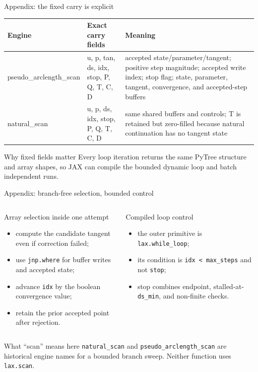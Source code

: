 \begin{frame}{Appendix: the fixed carry is explicit}
\scriptsize
\begin{center}
\begin{tabular}{>{\ttfamily}p{}p{}p{}}
\toprule
Engine & Exact carry fields & Meaning\\
\midrule
pseudo\_arclength\_scan &
u, p, tan, ds, idx, stop, P, Q, T, C, D &
accepted state/parameter/tangent; positive step magnitude; accepted write
index; stop flag; state, parameter, tangent, convergence, and accepted-step buffers\\
\addlinespace
natural\_scan &
u, p, ds, idx, stop, P, Q, T, C, D &
same shared buffers and controls; T is retained but zero-filled because natural continuation has no tangent state\\
\bottomrule
\end{tabular}
\end{center}

\begin{block}{Why fixed fields matter}
Every loop iteration returns the same PyTree structure and array shapes, so
JAX can compile the bounded dynamic loop and batch independent runs.
\end{block}
\end{frame}

\begin{frame}{Appendix: branch-free selection, bounded control}
\small
\begin{columns}[T,onlytextwidth]
\begin{block}{Array selection inside one attempt}
\begin{itemize}
  \item compute the candidate tangent even if correction failed;
  \item use \texttt{jnp.where} for buffer writes and accepted state;
  \item advance \texttt{idx} by the boolean convergence value;
  \item retain the prior accepted point after rejection.
\end{itemize}
\end{block}
\begin{block}{Compiled loop control}
\begin{itemize}
  \item the outer primitive is \texttt{lax.while\_loop};
  \item its condition is \texttt{idx < max\_steps} and not \texttt{stop};
  \item stop combines endpoint, stalled-at-\texttt{ds\_min}, and non-finite checks.
\end{itemize}
\end{block}
\end{columns}

\begin{alertblock}{What ``scan'' means here}
\texttt{natural\_scan} and \texttt{pseudo\_arclength\_scan} are historical
engine names for a bounded branch sweep. Neither function uses \texttt{lax.scan}.
\end{alertblock}
\end{frame}

